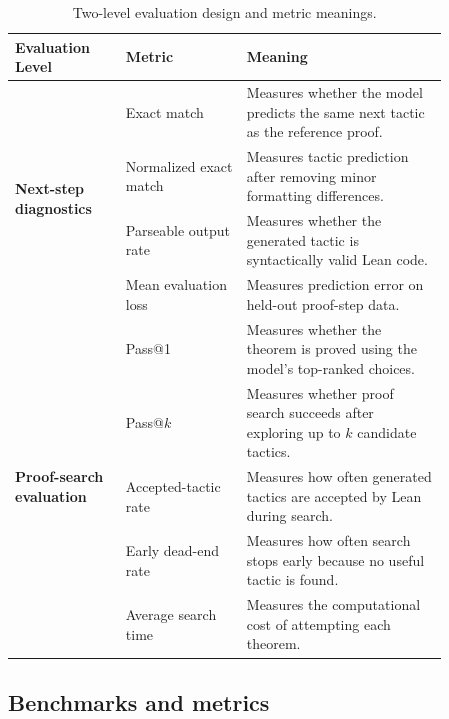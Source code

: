 \documentclass{article} %
\begin{document}
\begin{table}[!htbp]
\centering
\small
\caption{Two-level evaluation design and metric meanings.}
\label{tab:evaluation_metrics}
\begin{tabular}{p{0.22\linewidth} p{0.24\linewidth} p{0.40\linewidth}}
\toprule
\textbf{Evaluation Level} & \textbf{Metric} & \textbf{Meaning} \\
\midrule

\multirow{4}{=}{\textbf{Next-step diagnostics}
\citep{huang2018gamepad,yang2019coqgym,blaauwbroek2020tactic}} 
& Exact match 
& Measures whether the model predicts the same next tactic as the reference proof. \\

& Normalized exact match 
& Measures tactic prediction after removing minor formatting differences. \\

& Parseable output rate 
& Measures whether the generated tactic is syntactically valid Lean code. \\

& Mean evaluation loss 
& Measures prediction error on held-out proof-step data. \\

\midrule

\multirow{5}{=}{\textbf{Proof-search evaluation} \citep{thakur2025proofwala,yang2023leandojo,lample2022hypertree}} 
& Pass@1 
& Measures whether the theorem is proved using the model's top-ranked choices. \\

& Pass@$k$ 
& Measures whether proof search succeeds after exploring up to $k$ candidate tactics. \\

& Accepted-tactic rate 
& Measures how often generated tactics are accepted by Lean during search. \\

& Early dead-end rate 
& Measures how often search stops early because no useful tactic is found. \\

& Average search time 
& Measures the computational cost of attempting each theorem. \\

\bottomrule
\end{tabular}
\end{table}

\subsection{Benchmarks and metrics}
\label{subsec:evaluation-metrics}
\end{document}
